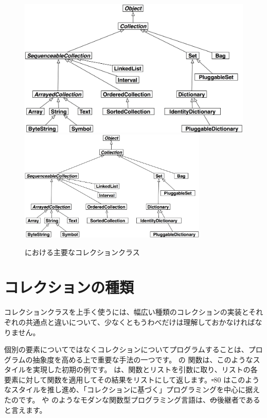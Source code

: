 \documentclass[a4paper,10pt,twoside]{book}
\begin{document}
\begin{figure}
\begin{center}
\ifluluelse
	{\includegraphics[width=\textwidth]{CollectionHierarchy}}
	{\includegraphics[width=0.8\textwidth]{CollectionHierarchy}}
\caption{\pharo における主要なコレクションクラス}
\end{center}
\end{figure}

\section{コレクションの種類}

コレクションクラスを上手く使うには、幅広い種類のコレクションの実装とそれぞれの共通点と違いについて、少なくともうわべだけは理解しておかなければなりません。

個別の要素についてではなくコレクションについてプログラムすることは、プログラムの抽象度を高める上で重要な手法の一つです。
 の  関数は、このようなスタイルを実現した初期の例です。 は、関数とリストを引数に取り、リストの各要素に対して関数を適用してその結果をリストにして返します。\st-80 はこのようなスタイルを推し進め、「コレクションに基づく」プログラミングを中心に据えたのです。 や  のようなモダンな関数型プログラミング言語は、\st の後継者であると言えます。%
\end{document}
